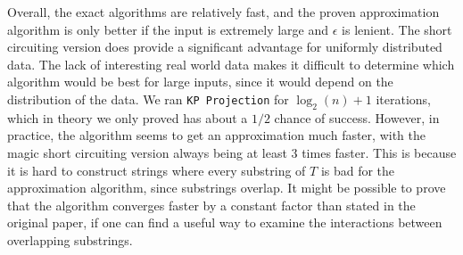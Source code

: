 \documentclass{article}
\theoremstyle{definition}
\newcommand{\eps}{\epsilon}
\begin{document}
Overall, the exact algorithms are relatively fast, and the proven approximation algorithm is only better if the input is extremely large and $\eps$ is lenient.
The short circuiting version does provide a significant advantage for uniformly distributed data.
The lack of interesting real world data makes it difficult to determine which algorithm would be best for large inputs, since it would depend on the distribution of the data.
We ran \texttt{KP Projection} for $\log_2(n) + 1$ iterations, which in theory we only proved has about a $1/2$ chance of success.
However, in practice, the algorithm seems to get an approximation much faster, with the magic short circuiting version always being at least $3$ times faster.
This is because it is hard to construct strings where every substring of $T$ is bad for the approximation algorithm, since substrings overlap.
It might be possible to prove that the algorithm converges faster by a constant factor than stated in the original paper, if one can find a useful way to examine the interactions between overlapping substrings.



\end{document}
